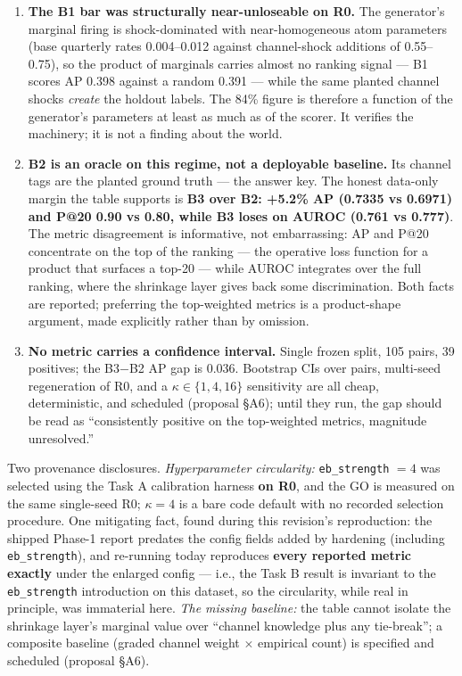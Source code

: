 \documentclass[11pt]{article}
\begin{document}
\begin{enumerate}[leftmargin=1.6em]
\item \textbf{The B1 bar was structurally near-unloseable on R0.} The
  generator's marginal firing is shock-dominated with near-homogeneous atom
  parameters (base quarterly rates 0.004--0.012 against channel-shock
  additions of 0.55--0.75), so the product of marginals carries almost no
  ranking signal --- B1 scores AP 0.398 against a random 0.391 --- while
  the same planted channel shocks \emph{create} the holdout labels. The
  84\% figure is therefore a function of the generator's parameters at
  least as much as of the scorer. It verifies the machinery; it is not a
  finding about the world.
\item \textbf{B2 is an oracle on this regime, not a deployable baseline.}
  Its channel tags are the planted ground truth --- the answer key. The
  honest data-only margin the table supports is \textbf{B3 over B2: +5.2\%
  AP (0.7335 vs 0.6971) and P@20 0.90 vs 0.80, while B3 loses on AUROC
  (0.761 vs 0.777)}. The metric disagreement is informative, not
  embarrassing: AP and P@20 concentrate on the top of the ranking --- the
  operative loss function for a product that surfaces a top-20 --- while
  AUROC integrates over the full ranking, where the shrinkage layer gives
  back some discrimination. Both facts are reported; preferring the
  top-weighted metrics is a product-shape argument, made explicitly rather
  than by omission.
\item \textbf{No metric carries a confidence interval.} Single frozen
  split, 105 pairs, 39 positives; the B3$-$B2 AP gap is 0.036. Bootstrap
  CIs over pairs, multi-seed regeneration of R0, and a
  $\kappa \in \{1, 4, 16\}$ sensitivity are all cheap, deterministic, and
  scheduled (proposal \S A6); until they run, the gap should be read as
  ``consistently positive on the top-weighted metrics, magnitude
  unresolved.''
\end{enumerate}

Two provenance disclosures. \emph{Hyperparameter circularity:}
\texttt{eb\_strength} $= 4$ was selected using the Task A calibration
harness \textbf{on R0}, and the GO is measured on the same single-seed R0;
$\kappa = 4$ is a bare code default with no recorded selection procedure.
One mitigating fact, found during this revision's reproduction: the shipped
Phase-1 report predates the config fields added by hardening (including
\texttt{eb\_strength}), and re-running today reproduces \textbf{every
reported metric exactly} under the enlarged config --- i.e., the Task B
result is invariant to the \texttt{eb\_strength} introduction on this
dataset, so the circularity, while real in principle, was immaterial here.
\emph{The missing baseline:} the table cannot isolate the shrinkage layer's
marginal value over ``channel knowledge plus any tie-break''; a composite
baseline (graded channel weight $\times$ empirical count) is specified and
scheduled (proposal \S A6).
\end{document}
